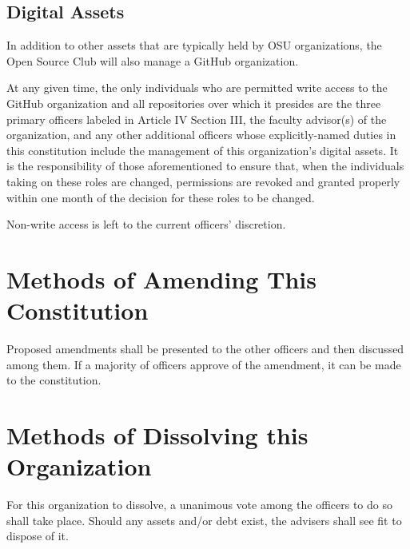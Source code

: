 \documentclass[12pt,letterpaper]{article}
\begin{document}
\subsection{Digital Assets}

In addition to other assets that are typically held by OSU organizations, the Open Source
Club will also manage a GitHub organization.

At any given time, the only individuals who are permitted write access to the GitHub
organization and all repositories over which it presides are the three primary officers
labeled in Article IV Section III, the faculty advisor(s) of the organization, and any
other additional officers whose explicitly-named duties in this constitution include the
management of this organization's digital assets. It is the responsibility of those
aforementioned to ensure that, when the individuals taking on these roles are changed,
permissions are revoked and granted properly within one month of the decision for these
roles to be changed.

Non-write access is left to the current officers' discretion.

\section{Methods of Amending This Constitution}

Proposed amendments shall be presented to the other officers and then discussed among
them. If a majority of officers approve of the amendment, it can be made to the constitution.

\section{Methods of Dissolving this Organization}

For this organization to dissolve, a unanimous vote among the officers to do so shall
take place. Should any assets and/or debt exist, the advisers shall see fit to dispose of
it.

%
%
%
\end{document}
